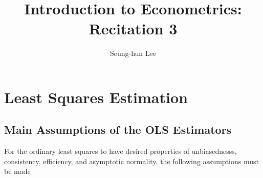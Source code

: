\documentclass[12pt]{article}
\title{Introduction to Econometrics: Recitation 3}
\theoremstyle{definition}
\theoremstyle{property}
\theoremstyle{assumption}
\theoremstyle{example}
\theoremstyle{comment}
\begin{document}
\linespread{1.25}
\author{Seung-hun Lee}
\date{}
\maketitle



\section{Least Squares Estimation}

\subsection{Main Assumptions of the OLS Estimators}
For the ordinary least squares to have desired properties of unbiasednesss, consistency, efficiency, and asymptotic normality, the following assumptions must be made
\end{document}
